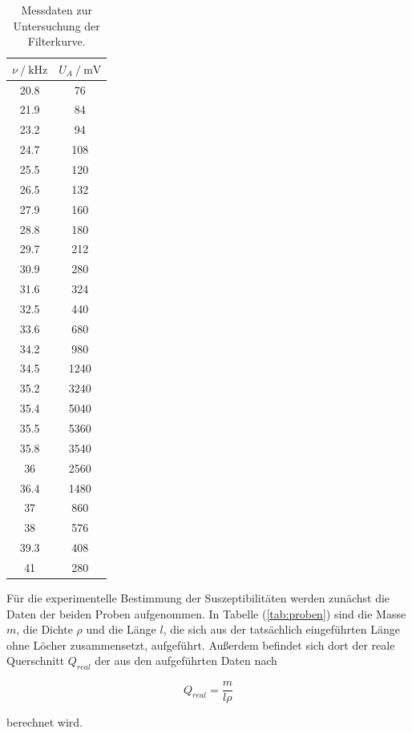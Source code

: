 \begin{table}
\centering
\begin{tabular}{c c}
\toprule
{$\nu \mathbin{/} \si{\kilo\hertz} $} & {$U_A \mathbin{/} \si{\milli\volt}$}  \\
\midrule
20.8  &    76 \\
21.9  &    84 \\
23.2  &    94 \\
24.7  &   108 \\
25.5  &   120 \\
26.5  &   132 \\
27.9  &   160 \\
28.8  &   180 \\
29.7  &   212 \\
30.9  &   280 \\
31.6  &   324 \\
32.5  &   440 \\
33.6  &   680 \\
34.2  &   980 \\
34.5  &  1240 \\
35.2  &  3240 \\
35.4  &  5040 \\
35.5  &  5360 \\
35.8  &  3540 \\
36    &  2560 \\
36.4  &  1480 \\
37    &   860 \\
38    &   576 \\
39.3  &   408 \\
41    &   280 \\
\bottomrule
\end{tabular}
\caption{Messdaten zur Untersuchung der Filterkurve.}
\label{tab:selektiv}
\end{table}

\newpage
\noindent
Für die experimentelle Bestimmung der Suszeptibilitäten werden zunächst die Daten der beiden Proben aufgenommen.
In Tabelle (\ref{tab:proben}) sind die Masse $m$, die Dichte $\rho$ und die Länge $l$, 
die sich aus der tatsächlich eingeführten Länge ohne Löcher zusammensetzt, aufgeführt.
Außerdem befindet sich dort der reale Querschnitt $Q_{real}$ 
der aus den aufgeführten Daten nach 

\begin{equation}
Q_{real} = \frac{m}{l\rho}
\end{equation}

\noindent
berechnet wird.

